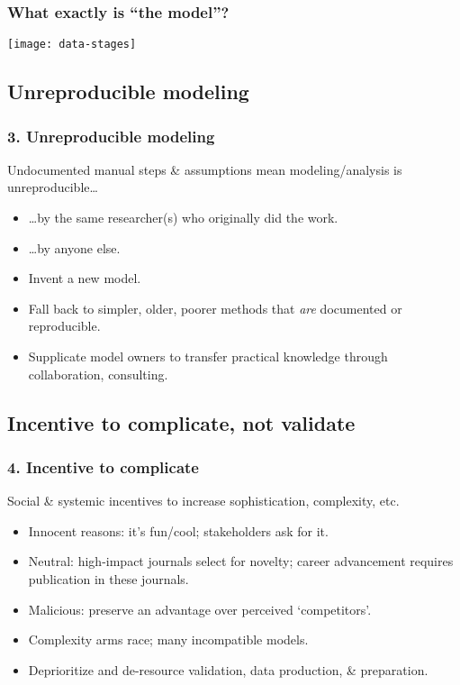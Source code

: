 \documentclass[14pt,aspectratio=169]{beamer}
\begin{document}
\begin{frame}
\frametitle{What exactly is “the model”?}

\texttt{[image: data-stages]}

\end{frame}


\subsection{Unreproducible modeling}

\begin{frame}
\frametitle{3. Unreproducible modeling}

Undocumented manual steps \& assumptions mean modeling/analysis is unreproducible…
\begin{itemize}
  \item …by the same researcher(s) who originally did the work.
  \item …by anyone else.
\end{itemize}

\bigskip
\pause
{}
\begin{itemize}
  \item Invent a new model.
  \item Fall back to simpler, older, poorer methods that \emph{are} documented or reproducible.
  \item Supplicate model owners to transfer practical knowledge through collaboration, consulting.
\end{itemize}

\end{frame}

\subsection{Incentive to complicate, not validate}

\begin{frame}
\frametitle{4. Incentive to complicate}

Social \& systemic incentives to increase sophistication, complexity, etc.
\begin{itemize}
  \item Innocent reasons: it's fun/cool; stakeholders ask for it.
  \item Neutral: high-impact journals select for novelty; career advancement requires publication in these journals.
  \item Malicious: preserve an advantage over perceived ‘competitors’.
\end{itemize}

\bigskip
\pause
{}
\begin{itemize}
  \item Complexity arms race; many incompatible models.
  \item Deprioritize and de-resource validation, data production, \& preparation.
\end{itemize}

\end{frame}
\end{document}
